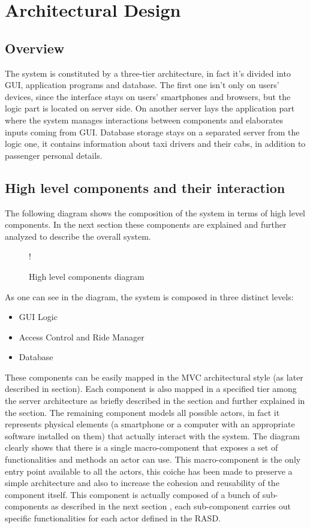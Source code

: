 \section{Architectural Design}
\subsection{Overview}
\label{sec:overview}
The system is constituted by a three-tier architecture, in fact it's divided into GUI, application programs and database. The first one isn't only on users' devices, since the interface stays on users' smartphones and browsers, but the logic part is located on server side. On another server lays the application part where the system manages interactions between components and elaborates inputs coming from GUI. Database storage stays on a separated server from the logic one, it contains information about taxi drivers and their cabs, in addition to passenger personal details.  
\subsection{High level components and their interaction}
\label{sec:high-level}
The following diagram shows the composition of the system in terms of high level components. \newline
In the next section these components are explained and further analyzed to describe the overall system.
\begin{figure}[H]
	\centering
	\resizebox{6in}
	{!}{}
	\caption{High level components diagram}
\end{figure}
As one can see in the diagram, the system is composed in three distinct levels:
\begin{itemize}
	\item GUI Logic
	\item Access Control and Ride Manager
	\item Database
\end{itemize}
These components can be easily mapped in the MVC architectural style (as later described in  section).
Each component is also mapped in a specified tier among the server architecture as briefly described in the  section and further explained in the  section.
The remaining component models all possible actors, in fact it represents physical elements (a smartphone or a computer with an appropriate software installed on them) that actually interact with the system. \newline
The diagram clearly shows that there is a single macro-component that exposes a set of functionalities and methods an actor can use. This macro-component is the only entry point available to all the actors, this coiche has been made to preserve a simple architecture and also to increase the cohesion and reusability of the component itself. \newline
This component is actually composed of a bunch of sub-components as described in the next section , each sub-component carries out specific functionalities for each actor defined in the RASD.
